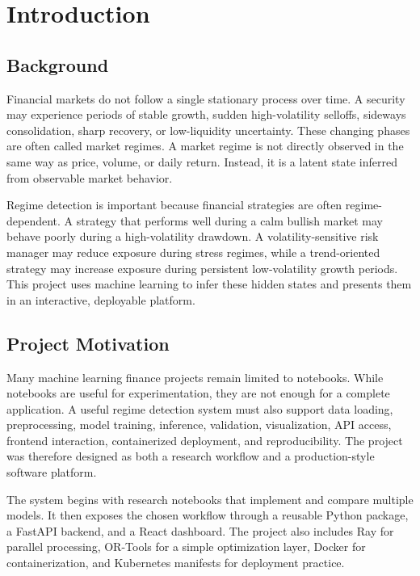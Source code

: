 \documentclass[12pt,a4paper]{report}
\begin{document}
\clearpage
{}

\chapter{Introduction}
\section{Background}
Financial markets do not follow a single stationary process over time. A security may experience periods of stable growth, sudden high-volatility selloffs, sideways consolidation, sharp recovery, or low-liquidity uncertainty. These changing phases are often called market regimes. A market regime is not directly observed in the same way as price, volume, or daily return. Instead, it is a latent state inferred from observable market behavior.

Regime detection is important because financial strategies are often regime-dependent. A strategy that performs well during a calm bullish market may behave poorly during a high-volatility drawdown. A volatility-sensitive risk manager may reduce exposure during stress regimes, while a trend-oriented strategy may increase exposure during persistent low-volatility growth periods. This project uses machine learning to infer these hidden states and presents them in an interactive, deployable platform.

\section{Project Motivation}
Many machine learning finance projects remain limited to notebooks. While notebooks are useful for experimentation, they are not enough for a complete application. A useful regime detection system must also support data loading, preprocessing, model training, inference, validation, visualization, API access, frontend interaction, containerized deployment, and reproducibility. The project was therefore designed as both a research workflow and a production-style software platform.

The system begins with research notebooks that implement and compare multiple models. It then exposes the chosen workflow through a reusable Python package, a FastAPI backend, and a React dashboard. The project also includes Ray for parallel processing, OR-Tools for a simple optimization layer, Docker for containerization, and Kubernetes manifests for deployment practice.
\end{document}
